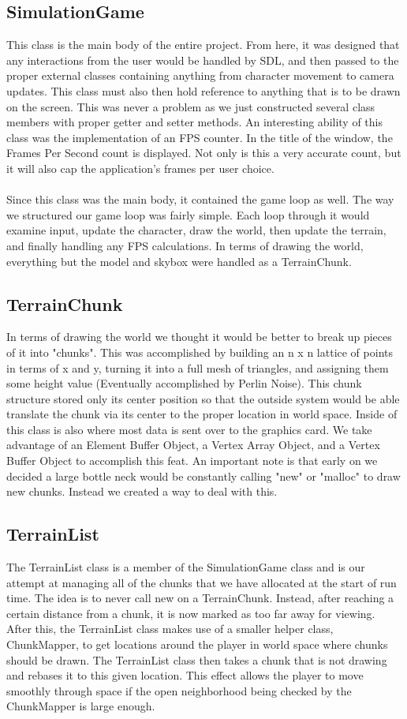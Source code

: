 \documentclass[paper=a4, fontsize=11pt]{scrartcl}
\numberwithin{equation}{section}		%
\numberwithin{figure}{section}			%
\numberwithin{table}{section}				%
\begin{document}
\subsection{SimulationGame}
This class is the main body of the entire project. From here, it was designed that any interactions from the user would be handled by SDL, and then passed to the proper external classes containing anything from character movement to camera updates. This class must also then hold reference to anything that is to be drawn on the screen. This was never a problem as we just constructed several class members with proper getter and setter methods. An interesting ability of this class was the implementation of an FPS counter. In the title of the window, the Frames Per Second count is displayed. Not only is this a very accurate count, but it will also cap the application's frames per user choice.
\\ \\
Since this class was the main body, it contained the game loop as well. The way we structured our game loop was fairly simple. Each loop through it would examine input, update the character, draw the world, then update the terrain, and finally handling any FPS calculations. In terms of drawing the world, everything but the model and skybox were handled as a TerrainChunk.
\subsection{TerrainChunk}
In terms of drawing the world we thought it would be better to break up pieces of it into "chunks". This was accomplished by building an n x n lattice of points in terms of x and y, turning it into a full mesh of triangles, and assigning them some height value (Eventually accomplished by Perlin Noise). This chunk structure stored only its center position so that the outside system would be able translate the chunk via its center to the proper location in world space. Inside of this class is also where most data is sent over to the graphics card. We take advantage of an Element Buffer Object, a Vertex Array Object, and a Vertex Buffer Object to accomplish this feat. An important note is that early on we decided a large bottle neck would be constantly calling "new" or "malloc" to draw new chunks. Instead we created a way to deal with this.
\subsection{TerrainList}
The TerrainList class is a member of the SimulationGame class and is our attempt at managing all of the chunks that we have allocated at the start of run time. The idea is to never call new on a TerrainChunk. Instead, after reaching a certain distance from a chunk, it is now marked as too far away for viewing. After this, the TerrainList class makes use of a smaller helper class, ChunkMapper, to get locations around the player in world space where chunks should be drawn. The TerrainList class then takes a chunk that is not drawing and rebases it to this given location. This effect allows the player to move smoothly through space if the open neighborhood being checked by the ChunkMapper is large enough.
\end{document}
